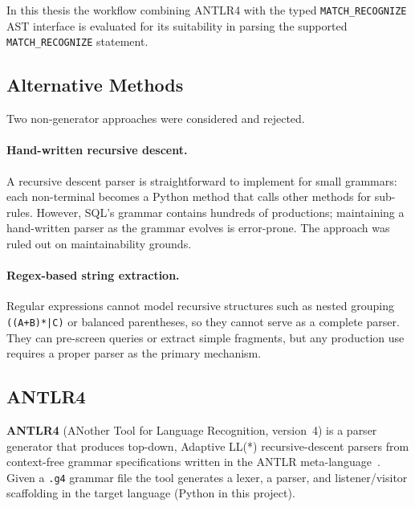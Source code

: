In this thesis the workflow combining ANTLR4 with the typed
\texttt{MATCH\_RECOGNIZE} AST interface is evaluated for its
suitability in parsing the supported \texttt{MATCH\_RECOGNIZE}
statement.

\subsection{Alternative Methods}
\label{subsec:meth-alternatives}

Two non-generator approaches were considered and rejected.

\paragraph{Hand-written recursive descent.}
A recursive descent parser is straightforward to implement for
small grammars: each non-terminal becomes a Python method that
calls other methods for sub-rules.  However, SQL's grammar contains
hundreds of productions; maintaining a hand-written parser as the
grammar evolves is error-prone.  The approach was ruled out on
maintainability grounds.

\paragraph{Regex-based string extraction.}
Regular expressions cannot model recursive structures such as nested
grouping \texttt{((A+B)*|C)} or balanced parentheses, so they
cannot serve as a complete parser.  They can pre-screen queries or
extract simple fragments, but any production use requires a proper
parser as the primary mechanism.

\subsection{ANTLR4}
\label{subsec:meth-antlr4}

\textbf{ANTLR4} (ANother Tool for Language Recognition, version~4)
is a parser generator that produces top-down, Adaptive LL(*)
recursive-descent parsers from context-free grammar specifications
written in the ANTLR meta-language~\cite{Parr2013,parr2014adaptive,antlr_website,parr_antlr_docs}.  Given a \texttt{.g4} grammar
file the tool generates a lexer, a parser, and listener/visitor
scaffolding in the target language (Python in this project).

